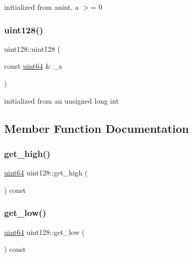 initialized from anint, a $>$= 0 

\mbox{\label{classuint128_a655c92ad28efbc6378c95510556475a7}} 
\subsubsection{\texorpdfstring{uint128()}{uint128()}\hspace{0.1cm}{\footnotesize\ttfamily [6/6]}}
{\footnotesize\ttfamily uint128\+::uint128 (\begin{DoxyParamCaption}\item[{const \hyperlink{types_8h_a60e8696a4678cd348e991a1f172e53f7}{uint64} \&}]{\+\_\+a }\end{DoxyParamCaption})\hspace{0.3cm}{\ttfamily [inline]}}



initialized from an unsigned long int 



\subsection{Member Function Documentation}
\mbox{\label{classuint128_a597036514f1abbbc8626492230f3436f}} 
\subsubsection{\texorpdfstring{get\+\_\+high()}{get\_high()}}
{\footnotesize\ttfamily \hyperlink{types_8h_a60e8696a4678cd348e991a1f172e53f7}{uint64} uint128\+::get\+\_\+high (\begin{DoxyParamCaption}{ }\end{DoxyParamCaption}) const\hspace{0.3cm}{\ttfamily [inline]}}

\mbox{\label{classuint128_adeb81ae4b8a8acbf46131e17ff7acc05}} 
\subsubsection{\texorpdfstring{get\+\_\+low()}{get\_low()}}
{\footnotesize\ttfamily \hyperlink{types_8h_a60e8696a4678cd348e991a1f172e53f7}{uint64} uint128\+::get\+\_\+low (\begin{DoxyParamCaption}{ }\end{DoxyParamCaption}) const\hspace{0.3cm}{\ttfamily [inline]}}


